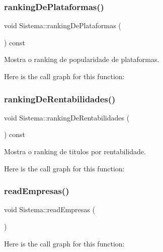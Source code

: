 \subsubsection{\texorpdfstring{ranking\+De\+Plataformas()}{rankingDePlataformas()}}
{\footnotesize\ttfamily void Sistema\+::ranking\+De\+Plataformas (\begin{DoxyParamCaption}{ }\end{DoxyParamCaption}) const}



Mostra o ranking de popularidade de plataformas. 

Here is the call graph for this function\+:
\mbox{\label{class_sistema_a6fb78c2cafbf5b6703d126ef43ba43f0}} 
\subsubsection{\texorpdfstring{ranking\+De\+Rentabilidades()}{rankingDeRentabilidades()}}
{\footnotesize\ttfamily void Sistema\+::ranking\+De\+Rentabilidades (\begin{DoxyParamCaption}{ }\end{DoxyParamCaption}) const}



Mostra o ranking de titulos por rentabilidade. 

Here is the call graph for this function\+:
\mbox{\label{class_sistema_aeffb6968ea519c472e90dfec1a2a072e}} 
\subsubsection{\texorpdfstring{read\+Empresas()}{readEmpresas()}}
{\footnotesize\ttfamily void Sistema\+::read\+Empresas (\begin{DoxyParamCaption}{ }\end{DoxyParamCaption})}

Here is the call graph for this function\+:
\mbox{\label{class_sistema_a00f929e5b2ca1dcc821edb14f9de5a24}} 
